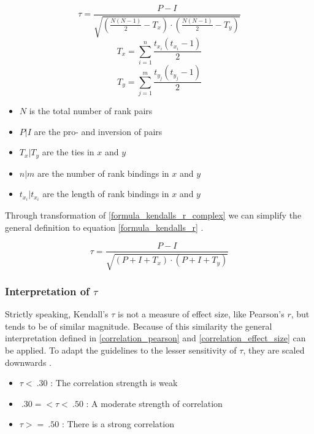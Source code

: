 \begin{equation}
	\label{formula_kendalls_r_complex}
	\tau = \frac{P-I}{\sqrt{\left(\frac{N(N-1)}{2}-T_x\right) \cdot \left(\frac{N(N-1)}{2}-T_y\right)}}
\end{equation}
\begin{equation}
	\label{formula_kendalls_r_tx}
	T_x = \sum_{i=1}^n \frac{t_{x_i}(t_{x_i}-1)}{2}
\end{equation}
\begin{equation}
	\label{formula_kendalls_r_ty}
	T_y = \sum_{j=1}^m \frac{t_{y_j}(t_{y_j}-1)}{2}
\end{equation}
\smallskip

\begin{itemize}
	\setlength\itemsep{0.1em}	
	\item[] $N$ is the total number of rank pairs 
	\item[] $P | I$ are the pro- and inversion of pairs
	\item[] $T_x | T_y$ are the ties in $x$ and $y$
	\item[] $n | m$ are the number of rank bindings in $x$ and $y$
	\item[] $t_{x_i} | t_{x_i}$ are the length of rank bindings in $x$ and $y$
\end{itemize}

\bigskip

Through transformation of \cref{formula_kendalls_r_complex} we can simplify the general definition to equation \ref{formula_kendalls_r} \parencite{Reiter2015}.

\begin{equation}
\label{formula_kendalls_r}
	\tau = \frac{P-I}{\sqrt{(P+I+T_x) \cdot (P+I+T_y)}}
\end{equation}

\subsubsection{Interpretation of $\tau$}
Strictly speaking, Kendall's $\tau$ is not a measure of effect size, like Pearson's $r$, but tends to be of similar magnitude. Because of this similarity the general interpretation defined in \cref{correlation_pearson} and \cref{correlation_effect_size} can be applied. To adapt the guidelines to the lesser sensitivity of $\tau$, they are scaled downwards \parencite{Regber2016}.

\begin{itemize}
	\item $\tau < \: .30$ : The correlation strength is weak
	\item $\: .30 =< \tau < \: .50$ : A moderate strength of correlation
	\item $\tau >= \: .50$ : There is a strong correlation
\end{itemize}

